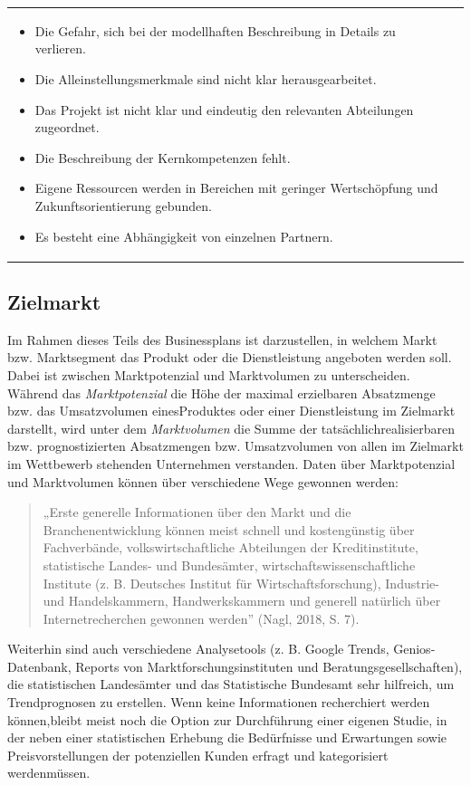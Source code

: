\documentclass[
  letterpaper,
]{book}
\begin{document}
\begin{longtable}[]{@{}
  >{\raggedright\arraybackslash}p{}
  >{\raggedright\arraybackslash}p{}@{}}
\begin{minipage}[t]{\linewidth}
\begin{itemize}
\item
  Die Gefahr, sich bei der modellhaften Beschreibung in Details zu
  verlieren.
\item
  Die Alleinstellungsmerkmale sind nicht klar herausgearbeitet.
\item
  Das Projekt ist nicht klar und eindeutig den relevanten Abteilungen
  zugeordnet.
\item
  Die Beschreibung der Kernkompetenzen fehlt.
\item
  Eigene Ressourcen werden in Bereichen mit geringer Wertschöpfung und
  Zukunftsorientierung gebunden.
\item
  Es besteht eine Abhängigkeit von einzelnen Partnern.
\end{itemize}
\end{minipage} \\
\end{longtable}

\subsection{Zielmarkt}\label{zielmarkt}

Im Rahmen dieses Teils des Businessplans ist darzustellen, in welchem
Markt bzw. Marktsegment das Produkt oder die Dienstleistung angeboten
werden soll. Dabei ist zwischen Marktpotenzial und Marktvolumen zu
unterscheiden. Während das \emph{Marktpotenzial }die Höhe der maximal
erzielbaren Absatzmenge bzw. das Umsatzvolumen einesProduktes oder einer
Dienstleistung im Zielmarkt darstellt, wird unter dem \emph{Marktvolumen
}die Summe der tatsächlichrealisierbaren bzw. prognostizierten
Absatzmengen bzw. Umsatzvolumen von allen im Zielmarkt im Wettbewerb
stehenden Unternehmen verstanden. Daten über Marktpotenzial und
Marktvolumen können über verschiedene Wege gewonnen werden:

\begin{quote}
„Erste generelle Informationen über den Markt und die
Branchenentwicklung können meist schnell und kostengünstig über
Fachverbände, volkswirtschaftliche Abteilungen der Kreditinstitute,
statistische Landes- und Bundesämter, wirtschaftswissenschaftliche
Institute (z. B. Deutsches Institut für Wirtschaftsforschung),
Industrie- und Handelskammern, Handwerkskammern und generell natürlich
über Internetrecherchen gewonnen werden'' (Nagl, 2018, S. 7).
\end{quote}

Weiterhin sind auch verschiedene Analysetools (z. B. Google Trends,
Genios-Datenbank, Reports von Marktforschungsinstituten und
Beratungsgesellschaften), die statistischen Landesämter und das
Statistische Bundesamt sehr hilfreich, um Trendprognosen zu erstellen.
Wenn keine Informationen recherchiert werden können,bleibt meist noch
die Option zur Durchführung einer eigenen Studie, in der neben einer
statistischen Erhebung die Bedürfnisse und Erwartungen sowie
Preisvorstellungen der potenziellen Kunden erfragt und kategorisiert
werdenmüssen.
\end{document}
